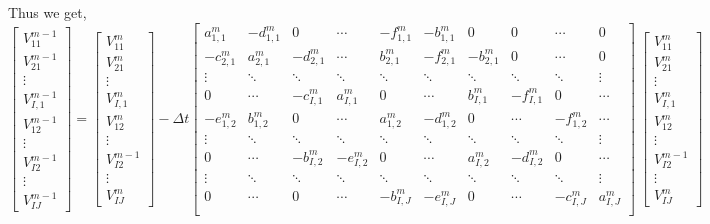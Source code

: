 \documentclass{article}
\begin{document}
\begin{enumerate}
Thus we get,
\[
\begin{bmatrix}
V^{m-1}_{11}\\
V^{m-1}_{21}\\
\vdots\\
V^{m-1}_{I,1}\\
V^{m-1}_{12}\\
\vdots \\
V^{m-1}_{I2}\\
\vdots\\
V^{m-1}_{IJ}
\end{bmatrix}
=
\begin{bmatrix}
V^{m}_{11}\\
V^{m}_{21}\\
\vdots\\
V^{m}_{I,1}\\
V^{m}_{12}\\
\vdots \\
V^{m-1}_{I2}\\
\vdots\\
V^{m}_{IJ}
\end{bmatrix}
-
\Delta{t}\begin{bmatrix}
a^{m}_{1,1} & -d^{m}_{1,1} & 0 & \cdots &-f^{m}_{1,1}&-b^{m}_{1,1}&0&0&\cdots&0 \\
-c^m_{2,1} & a^m_{2,1} & -d^m_{2,1} & \cdots &b^m_{2,1}&-f^m_{2,1}&-b^{m}_{2,1}&0&\cdots&0 \\
\vdots & \ddots & \ddots & \ddots & \ddots&\ddots&\ddots&\ddots&\ddots&\vdots \\
0&\cdots & -c^m_{I,1} & a^m_{I,1} & 0&\cdots&b^m_{I,1}&-f^{m}_{I,1}&0&\cdots \\
-e^{m}_{1,2} & b^{m}_{1,2} & 0 & \cdots &a^{m}_{1,2}&-d^{m}_{1,2}&0&\cdots&-f^m_{1,2}&\cdots \\
\vdots & \ddots & \ddots & \ddots & \ddots&\ddots&\ddots&\ddots&\ddots&\vdots \\
0&\cdots & -b^m_{I,2} & -e^m_{I,2} & 0&\cdots&a^m_{I,2}&-d^{m}_{I,2}&0&\cdots \\
\vdots & \ddots & \ddots & \ddots & \ddots&\ddots&\ddots&\ddots&\ddots&\vdots \\
0&\cdots&0&\cdots & -b^m_{I,J} & -e^m_{I,J} & 0&\cdots&-c^m_{I,J}&a^{m}_{I,J}\\
\end{bmatrix}\
\begin{bmatrix}
V^{m}_{11}\\
V^{m}_{21}\\
\vdots\\
V^{m}_{I,1}\\
V^{m}_{12}\\
\vdots \\
V^{m-1}_{I2}\\
\vdots\\
V^{m}_{IJ}
\end{bmatrix}
\] 


\end{enumerate}
\end{document}
